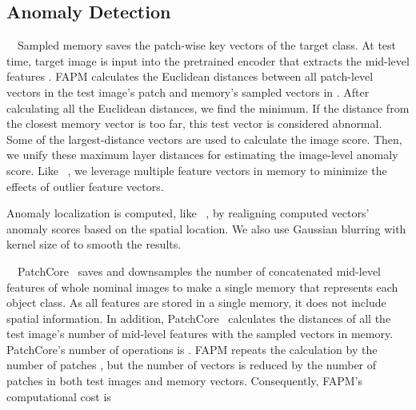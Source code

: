 \documentclass{article}
\begin{document}
 
\vspace{-0.4cm}
\subsection{Anomaly Detection}
\vspace{-0.15cm}
~~Sampled memory  saves the patch-wise key vectors  of the target class. At test time, target image  is input into the pretrained encoder that extracts the mid-level features . FAPM calculates the Euclidean distances between all patch-level vectors in the test image's patch  and memory's sampled vectors  in . After calculating all the Euclidean distances, we find the minimum. If the distance from the closest memory vector is too far, this test vector is considered abnormal. Some of the largest-distance vectors are used to calculate the image score. Then, we unify these maximum layer distances for estimating the image-level anomaly score. Like ~\cite{patchcore}, we leverage multiple feature vectors in memory to minimize the effects of outlier feature vectors. 


Anomaly localization is computed, like ~\cite{Padim, patchcore}, by realigning computed vectors’ anomaly scores based on the spatial location. We also use Gaussian blurring with kernel size of  to smooth the results.


	
~~PatchCore~\cite{patchcore} saves and downsamples the number of  concatenated mid-level features of whole nominal images to make a single memory that represents each object class. As all features are stored in a single memory, it does not include spatial information. In addition, PatchCore~\cite{patchcore} calculates the distances of all the test image’s number of  mid-level features with the sampled vectors in memory. PatchCore's number of operations is . FAPM repeats the calculation by the number of patches , but the number of vectors is reduced by the number of patches in both test images and memory vectors. Consequently, FAPM’s computational cost is  
\end{document}
